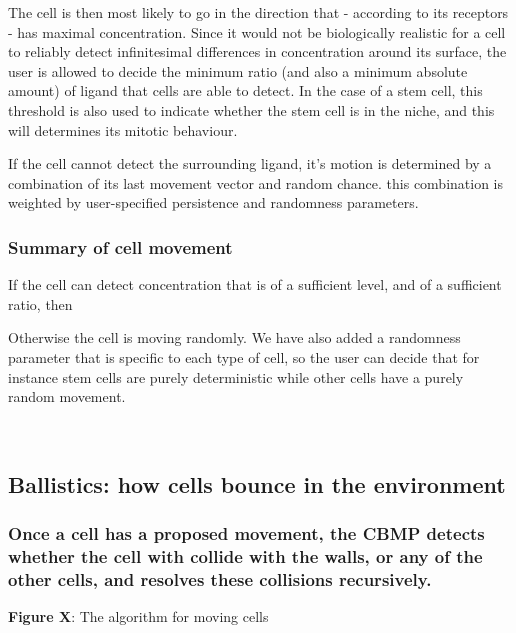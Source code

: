 \documentclass[11.5pt]{article}
\begin{document}
The cell is then most likely to go in the direction that - according to 
its receptors - has maximal concentration. Since it would not be 
biologically realistic for a cell to reliably detect infinitesimal 
differences in concentration around its surface, the user is allowed to 
decide the minimum ratio (and also a minimum absolute amount) of ligand 
that cells are able to detect. In the case of a stem cell, this 
threshold is also used to indicate whether the stem cell is in the 
niche, and this will determines its mitotic behaviour.



If the cell cannot detect the surrounding ligand, it's motion is 
determined by a combination of its last movement vector and random 
chance. this combination is weighted by user-specified persistence and 
randomness parameters.



\subsubsection{Summary of cell movement}
If the cell can detect concentration that is of a sufficient level, and 
of a sufficient ratio, then 



Otherwise the cell is moving randomly. We have also added a randomness 
parameter that is specific to each type of cell, so the user can decide 
that for instance stem cells are purely deterministic while other cells 
have a purely random movement.

\ \ \ \ \ \ \ \ \ \ \ \ \ \ \ \ 

\subsection{Ballistics: how cells bounce in the 
environment}
\subsubsection{{\bfseries Once a cell has a proposed movement, the CBMP 
detects whether the cell with collide with the walls, or any of the 
other cells, and resolves these collisions recursively.}
}




\begin{figure}[H]
\centering
\end{figure}


{\bfseries Figure X}: The algorithm for moving cells
\end{document}
